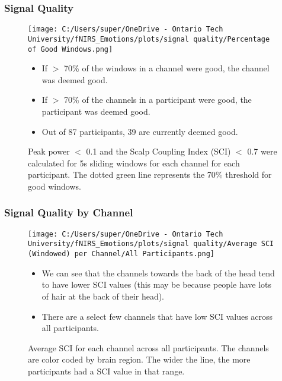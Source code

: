 \documentclass{beamer}
\begin{document}
\begin{frame}
    \frametitle{Signal Quality}
    \begin{figure}
        \texttt{[image: C:/Users/super/OneDrive - Ontario Tech University/fNIRS\_Emotions/plots/signal quality/Percentage of Good Windows.png]}
        \caption{Peak power $<$ 0.1 and the Scalp Coupling Index (SCI) $<$ 0.7 were calculated for 5s sliding windows for each channel for each participant.
        The dotted green line represents the 70\% threshold for good windows.
        }
            \begin{itemize}
                \item If $>$ 70\% of the windows in a channel were good, the channel was deemed good.
                \item If $>$ 70\% of the channels in a participant were good, the participant was deemed good.
                \item Out of 87 participants, 39 are currently deemed good.
            \end{itemize}
    \end{figure}
\end{frame}

\begin{frame}
    \frametitle{Signal Quality by Channel}
    \begin{figure}
        \texttt{[image: C:/Users/super/OneDrive - Ontario Tech University/fNIRS\_Emotions/plots/signal quality/Average SCI (Windowed) per Channel/All Participants.png]}
        \caption{Average SCI for each channel across all participants. The channels are color coded by brain region. The wider the line, the more participants had a SCI value in that range.}
            \begin{itemize}
                \item We can see that the channels towards the back of the head tend to have lower SCI values (this may be because people have lots of hair at the back of their head).
                \item There are a select few channels that have low SCI values across all participants. 
            \end{itemize}
    \end{figure}
\end{frame}
\end{document}
